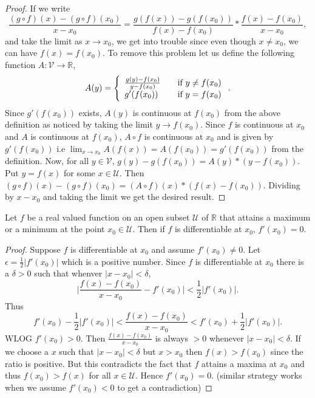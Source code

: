 \begin{proof}
    If we write \[ \frac{(g \circ f)(x) - (g \circ f)(x_0)} { x - x_0}  = \frac{g(f(x)) - 
	    g(f(x_0))}{f(x) - f(x_0)} * \frac{f(x) - f(x_0)}{x - x_0}, \] and take the limit as $x
    \to x_0$, we get into trouble since even though $x \neq x_0$, we can have $f(x) = f(x_0)$. To
    remove this problem let us define the following function $A : \mathcal{V} \to \mathbb{R}$,
    \[ A(y) = \left\{ 
  \begin{array}{l l}
      \frac{g(y) - f(x_0)}{y - f(x_0)} & \quad \text{if } y \neq f(x_0)\\
    g'(f(x_0)) & \quad \text{if } y = f(x_0) 
  \end{array} \right. .\]
   Since $g'(f(x_0))$ exists, $A(y)$ is continuous at $f(x_0)$ from the above definition as noticed
   by taking the limit $y \to f(x_0)$. Since $f$ is continuous at $x_0$ and $A$ is continuous at
   $f(x_0)$, $A \circ f$ is continuous at $x_0$ and is given by $ g'(f(x_0))$ i.e $ \lim_{x \to
       x_0} A(f(x)) = A(f(x_0)) = g'(f(x_0))$ from the definition. Now, for all $ y \in
   \mathcal{V}$, $g(y) - g(f(x_0)) = A(y)*(y - f(x_0))$. Put $ y = f(x)$ for some $x \in
   \mathcal{U}$. Then $(g \circ f)(x) - (g \circ f)(x_0) = (A \circ f)(x) * (f(x) - f(x_0))$.
   Dividing by $x -x_0$ and taking the limit we get the desired result. 
\end{proof}
\begin{Proposition}
    Let $f$ be a real valued function on an open subset $\mathcal{U}$ of $\mathbb{R}$ that attains a
    maximum or a minimum at the point $x_0 \in \mathcal{U}$. Then if $f$ is differentiable at $x_0$,
    $f'(x_0) = 0$.
\end{Proposition}
\begin{proof}
    Suppose $f$ is differentiable at $x_0$ and assume $f'(x_0) \neq 0$. Let $\epsilon =
    \frac{1}{2}\lvert f'(x_0) \rvert$ which is a positive number. Since $f$ is differentiable at
    $x_0$ there is a $\delta > 0$ such that whenver $\lvert x - x_0 \rvert < \delta$,
    \[ \lvert \frac{f(x) - f(x_0)}{x - x_0} - f'(x_0) \rvert <  \frac{1}{2}\lvert f'(x_0)\rvert.\] 
    Thus \[ f'(x_0) -  \frac{1}{2}\lvert f'(x_0) \rvert < \frac{f(x) - f(x_0)}{x - x_0} < f'(x_0) + 
	\frac{1}{2}\lvert f'(x_0) \rvert .\] WLOG $f'(x_0) > 0$. Then $\frac{f(x) - f(x_0)}{x - x_0}$ 
    is always $ > 0$ whenever $ \lvert x - x_0 \rvert < \delta$. If we choose a $x$ such that 
    $\lvert x - x_0 \rvert < \delta$ but $ x > x_0$ then $f(x) > f(x_0)$ since the ratio is
    positive. But this contradicts the fact that $f$ attains a maxima at $x_0$ and thus $f(x_0) >
    f(x)$ for all $x \in \mathcal{U}$. Hence $f'(x_0) = 0$. (similar strategy works when we assume
    $f'(x_0) < 0 $ to get a contradiction)
\end{proof}
